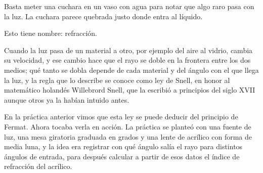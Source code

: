 Basta meter una cuchara en un vaso con agua para notar que algo raro pasa con la luz. La cuchara parece quebrada justo donde entra al líquido.

Esto tiene nombre: refracción.

Cuando la luz pasa de un material a otro, por ejemplo del aire al vidrio, cambia su velocidad, y ese cambio hace que el rayo se doble en la frontera entre los dos medios; qué tanto se dobla depende de cada material y del ángulo con el que llega la luz, y la regla que lo describe se conoce como ley de Snell, en honor al matemático holandés Willebrord Snell, que la escribió a principios del siglo XVII aunque otros ya la habían intuido antes.

En la práctica anterior vimos que esta ley se puede deducir del principio de Fermat. Ahora tocaba verla en acción. La práctica se planteó con una fuente de luz, una mesa giratoria graduada en grados y una lente de acrílico con forma de media luna, y la idea era registrar con qué ángulo salía el rayo para distintos ángulos de entrada, para después calcular a partir de esos datos el índice de refracción del acrílico.
